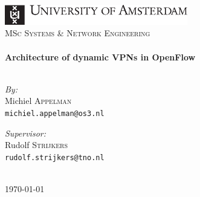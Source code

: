 %		
%		
%		

\clearpage
\begin{titlepage}
	\begin{center}
		\hfill \\[2cm]
		\includegraphics[width=8cm]{./includes/uva.pdf}\\[0.4cm]
		{\Large \textsc{MSc Systems \&{} Network Engineering}}\\[4.5cm]
		
		\THRule \\[0.6cm]
		{ \huge \bfseries Architecture of dynamic VPNs in OpenFlow}\\[0.4cm]
		\THRule \\[4.2cm]
		\begin{minipage}
			{0.4
			\textwidth} 
			\begin{flushleft}
				\large \emph{By:}\\
				Michiel \textsc{Appelman} \\
				{\footnotesize \texttt{michiel.appelman@os3.nl}}
			\end{flushleft}
		\end{minipage}
		\begin{minipage}
			{0.4
			\textwidth} 
			\begin{flushright}
				\large \emph{Supervisor:} \\
				Rudolf \textsc{Strijkers} \\
				{\footnotesize \texttt{rudolf.strijkers@tno.nl}}
				\hfill
			\end{flushright}
		\end{minipage}
		
		\hfill \\[4cm]
		
		{\large \today}
	\end{center}
\end{titlepage}

\cleardoublepage 
